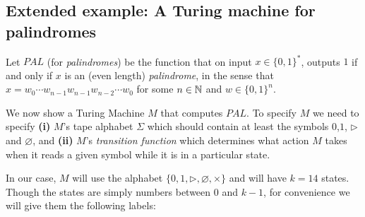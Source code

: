 \subsection{Extended example: A Turing machine for
palindromes}\label{turingmachinepalindrome}

Let \(\ensuremath{\mathit{PAL}}\) (for \emph{palindromes}) be the
function that on input \(x\in \{0,1\}^*\), outputs \(1\) if and only if
\(x\) is an (even length) \emph{palindrome}, in the sense that
\(x = w_0 \cdots w_{n-1}w_{n-1}w_{n-2}\cdots w_0\) for some \(n\in {\mathbb{N}}\)
and \(w\in \{0,1\}^n\).

We now show a Turing Machine \(M\) that computes
\(\ensuremath{\mathit{PAL}}\). To specify \(M\) we need to specify
\textbf{(i)} \(M\)'s tape alphabet \(\Sigma\) which should contain at
least the symbols \(0\),\(1\), \(\triangleright\) and \(\varnothing\),
and \textbf{(ii)} \(M\)'s \emph{transition function} which determines
what action \(M\) takes when it reads a given symbol while it is in a
particular state.

In our case, \(M\) will use the alphabet
\(\{ 0,1,\triangleright, \varnothing, \times \}\) and will have \(k=14\)
states. Though the states are simply numbers between \(0\) and \(k-1\),
for convenience we will give them the following labels:

